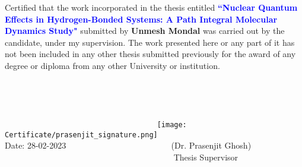 \vspace{14.0cm}
\begin{certificate}        %
\noindent  Certified that the work incorporated in the thesis entitled \textcolor {blue}
{\textbf{``Nuclear Quantum Effects in Hydrogen-Bonded Systems: A Path Integral Molecular Dynamics Study"}}
submitted by {\textbf{Unmesh Mondal}} was carried out by the
candidate, under my supervision. The work presented here or any part of it has not been
included in any other thesis submitted previously for the award of any degree or
diploma from any other University or institution.\\
\\
\\
\\
\\
${\qquad \qquad \qquad \qquad \qquad \qquad \qquad \qquad \qquad  }$ \texttt{[image: Certificate/prasenjit\_signature.png]} \\
Date: 28-02-2023 ${\qquad \qquad \qquad \qquad \qquad \qquad}$ (Dr. Prasenjit Ghosh)\\
${\qquad \qquad \qquad \qquad \qquad \qquad \qquad \qquad \qquad  \qquad}$ Thesis Supervisor
\end{certificate}
